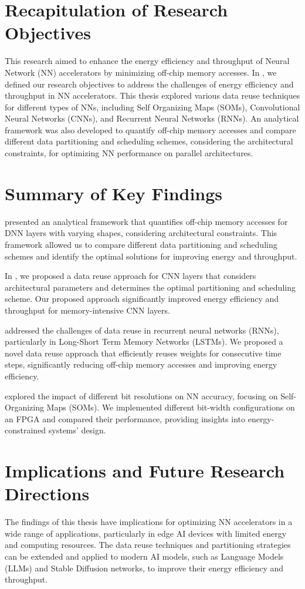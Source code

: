 \section{Recapitulation of Research Objectives}
This research aimed to enhance the energy efficiency and throughput of Neural Network (NN) accelerators by minimizing off-chip memory accesses. In , we defined our research objectives to address the challenges of energy efficiency and throughput in NN accelerators. This thesis explored various data reuse techniques for different types of NNs, including Self Organizing Maps (SOMs), Convolutional Neural Networks (CNNs), and Recurrent Neural Networks (RNNs). An analytical framework was also developed to quantify off-chip memory accesses and compare different data partitioning and scheduling schemes, considering the architectural constraints, for optimizing NN performance on parallel architectures. 

\section{Summary of Key Findings}
 presented an analytical framework that quantifies off-chip memory accesses for DNN layers with varying shapes, considering architectural constraints. This framework allowed us to compare different data partitioning and scheduling schemes and identify the optimal solutions for improving energy and throughput.

In , we proposed a data reuse approach for CNN layers that considers architectural parameters and determines the optimal partitioning and scheduling scheme. Our proposed approach significantly improved energy efficiency and throughput for memory-intensive CNN layers.

 addressed the challenges of data reuse in recurrent neural networks (RNNs), particularly in Long-Short Term Memory Networks (LSTMs). We proposed a novel data reuse approach that efficiently reuses weights for consecutive time steps, significantly reducing off-chip memory accesses and improving energy efficiency.

 explored the impact of different bit resolutions on NN accuracy, focusing on Self-Organizing Maps (SOMs). We implemented different bit-width configurations on an FPGA and compared their performance, providing insights into energy-constrained systems' design.
\section{Implications and Future Research Directions}
The findings of this thesis have implications for optimizing NN accelerators in a wide range of applications, particularly in edge AI devices with limited energy and computing resources. The data reuse techniques and partitioning strategies can be extended and applied to modern AI models, such as Language Models (LLMs) and Stable Diffusion networks, to improve their energy efficiency and throughput.

